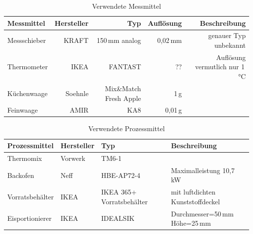 \begin{table}[H]
\centering
\caption{Verwendete Messmittel}
\label{table:messmittel}
\begin{tabular}{|l|r|r|r|r|}
\hline
Messmittel        & Hersteller & Typ          & Auflösung & Beschreibung \\
\hline
Messschieber      & KRAFT      & 150\,mm analog & 0,02\,mm    & genauer Typ unbekannt \\
Thermometer       & IKEA       & FANTAST      & ?? & Auflösung vermutlich nur 1\,°C \\      
Küchenwaage       & Soehnle    & Mix\&Match Fresh Apple & 1\,g &        \\
Feinwaage         & AMIR       & KA8          &  0,01\,g  &    \\    
\hline
\end{tabular}
\end{table}

\begin{table}[H]
\centering
\caption{Verwendete Prozessmittel}
\label{table:prozessmittel}
\begin{tabular}{|l|l|l|l|}
\hline
Prozessmittel     & Hersteller & Typ      & Beschreibung \\
\hline
Thermomix         & Vorwerk    & TM6-1    &        \\
Backofen          & Neff       & HBE-AP72-4 & Maximalleistung 10,7\,kW \\ 
Vorratsbehälter   & IKEA       & IKEA 365+ Vorratsbehälter & mit luftdichten Kunststoffdeckel \\
Eisportionierer   & IKEA       & IDEALSIK & Durchmesser=50\,mm Höhe=25\,mm \\
\hline
\end{tabular}
\end{table}

